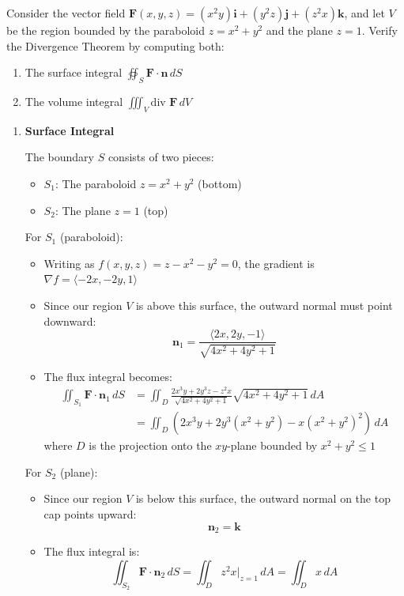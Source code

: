 \exampleline
\begin{example}
Consider the vector field $\mathbf{F}(x,y,z) = (x^2y)\mathbf{i} + (y^2z)\mathbf{j} + (z^2x)\mathbf{k}$, and let $V$ be the region bounded by the paraboloid $z = x^2 + y^2$ and the plane $z = 1$. Verify the Divergence Theorem by computing both:
\begin{enumerate}
    \item The surface integral $\oiint_S \mathbf{F} \cdot \mathbf{n}\,dS$
    \item The volume integral $\iiint_V \text{div }\mathbf{F}\,dV$
\end{enumerate}

\begin{solution}
\begin{enumerate}
\item \textbf{Surface Integral}

The boundary $S$ consists of two pieces:
\begin{itemize}
    \item $S_1$: The paraboloid $z = x^2 + y^2$ (bottom)
    \item $S_2$: The plane $z = 1$ (top)
\end{itemize}

For $S_1$ (paraboloid):
\begin{itemize}
    \item Writing as $f(x,y,z) = z - x^2 - y^2 = 0$, the gradient is $\nabla f = \langle-2x, -2y, 1\rangle$
    \item Since our region $V$ is above this surface, the outward normal must point downward:
    \[
    \mathbf{n}_1 = \frac{\langle 2x, 2y, -1 \rangle}{\sqrt{4x^2 + 4y^2 + 1}}
    \]
    \item The flux integral becomes:
    \begin{align*}
    \iint_{S_1} \mathbf{F} \cdot \mathbf{n}_1\,dS &= \iint_D \frac{2x^3y + 2y^3z - z^2x}{\sqrt{4x^2 + 4y^2 + 1}}\sqrt{4x^2 + 4y^2 + 1}\,dA \\
    &= \iint_D (2x^3y + 2y^3(x^2 + y^2) - x(x^2 + y^2)^2)\,dA
    \end{align*}
    where $D$ is the projection onto the $xy$-plane bounded by $x^2 + y^2 \leq 1$
\end{itemize}

For $S_2$ (plane):
\begin{itemize}
    \item Since our region $V$ is below this surface, the outward normal on the top cap points upward:
    \[
    \mathbf{n}_2 = \mathbf{k}
    \]
    \item The flux integral is:
    \[
    \iint_{S_2} \mathbf{F} \cdot \mathbf{n}_2\,dS = \iint_D z^2x\big|_{z=1}\,dA = \iint_D x\,dA
    \]
\end{itemize}


\end{enumerate}
\end{solution}
\end{example}
